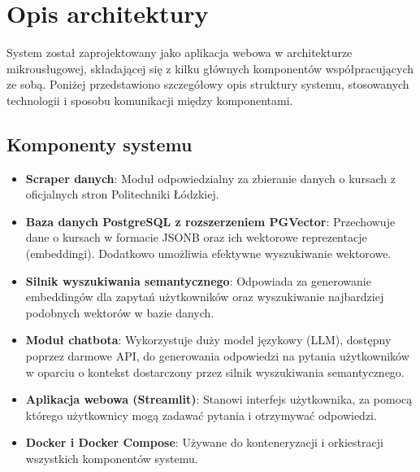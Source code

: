 \documentclass{article}
\begin{document}
\section{Opis architektury}
System został zaprojektowany jako aplikacja webowa w architekturze mikrousługowej, składającej się z kilku głównych komponentów współpracujących ze sobą. Poniżej przedstawiono szczegółowy opis struktury systemu, stosowanych technologii i sposobu komunikacji między komponentami.

\subsection{Komponenty systemu}
\begin{itemize}
    \item \textbf{Scraper danych}: Moduł odpowiedzialny za zbieranie danych o kursach z oficjalnych stron Politechniki Łódzkiej.
    \item \textbf{Baza danych PostgreSQL z rozszerzeniem PGVector}: Przechowuje dane o kursach w formacie JSONB oraz ich wektorowe reprezentacje (embeddingi). Dodatkowo umożliwia efektywne wyszukiwanie wektorowe.
    \item \textbf{Silnik wyszukiwania semantycznego}: Odpowiada za generowanie embeddingów dla zapytań użytkowników oraz wyszukiwanie najbardziej podobnych wektorów w bazie danych.
    \item \textbf{Moduł chatbota}: Wykorzystuje duży model językowy (LLM), dostępny poprzez darmowe API, do generowania odpowiedzi na pytania użytkowników w oparciu o kontekst dostarczony przez silnik wyszukiwania semantycznego.
    \item \textbf{Aplikacja webowa (Streamlit)}: Stanowi interfejs użytkownika, za pomocą którego użytkownicy mogą zadawać pytania i otrzymywać odpowiedzi.
    \item \textbf{Docker i Docker Compose}: Używane do konteneryzacji i orkiestracji wszystkich komponentów systemu.
\end{itemize}
\end{document}
